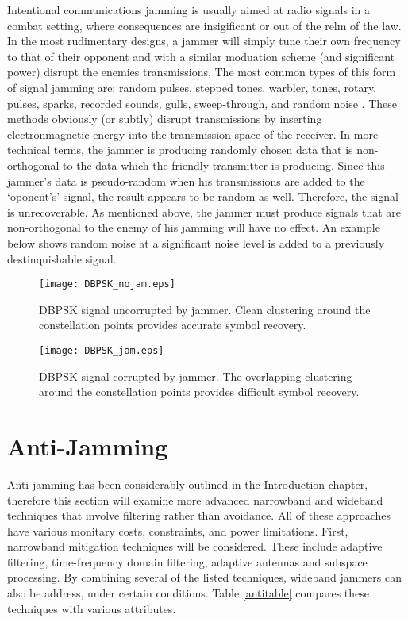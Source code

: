 Intentional communications jamming is usually aimed at radio signals in a combat setting, where consequences are insigificant or out of the relm of the law. In the most rudimentary designs, a jammer will simply tune their own frequency to that of their opponent and with a similar moduation scheme (and significant power) disrupt the enemies transmissions.  The most common types of this form of signal jamming are: random pulses, stepped tones, warbler, tones, rotary, pulses, sparks, recorded sounds, gulls, sweep-through, and random noise \cite{sterling}.  These methods obviously (or subtly) disrupt transmissions by inserting electronmagnetic energy into the transmission space of the receiver.  In more technical terms, the jammer is producing randomly chosen data that is non-orthogonal to the data which the friendly transmitter is producing.  Since this jammer's data is pseudo-random when his transmissions are added to the `oponent's' signal, the result appears to be random as well.  Therefore, the signal is unrecoverable.  As mentioned above, the jammer must produce signals that are non-orthogonal to the enemy of his jamming will have no effect.  An example below shows random noise at a significant noise level is added to a previously destinquishable signal.\\

\begin{figure}[!ht]
  \begin{minipage}[b]{0.5\linewidth}
    \centering
    \texttt{[image: DBPSK\_nojam.eps]}
    \caption{DBPSK signal uncorrupted by jammer.  Clean clustering around the constellation points provides accurate symbol recovery.}
    \label{fig:chapter001_dist_001}
  \end{minipage}
  \hspace{0.5cm}
  \begin{minipage}[b]{0.5\linewidth}
    \centering
    \texttt{[image: DBPSK\_jam.eps]}
    \caption{DBPSK signal corrupted by jammer.  The overlapping clustering around the constellation points provides difficult symbol recovery.}
    \label{fig:chapter001_reward_001}
  \end{minipage}
\end{figure}

\section{Anti-Jamming}

Anti-jamming has been considerably outlined in the Introduction chapter, therefore this section will examine more advanced narrowband and wideband techniques that involve filtering rather than avoidance.  All of these approaches have various monitary costs, constraints, and power limitations.  First, narrowband mitigation techniques will be considered.  These include adaptive filtering, time-frequency domain filtering, adaptive antennas and subspace processing.  By combining several of the listed techniques, wideband jammers can also be address, under certain conditions.  Table \ref{antitable} compares these techniques with various attributes.\\

